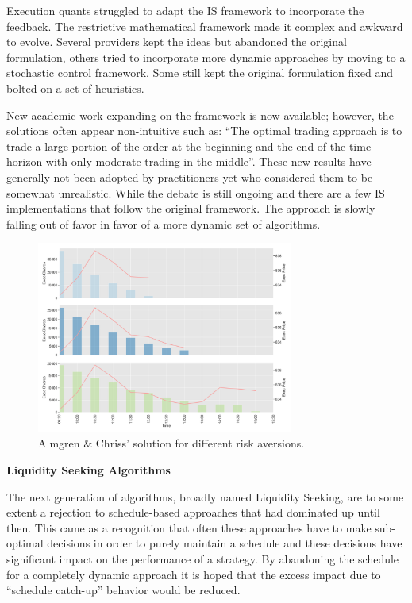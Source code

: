 Execution quants struggled to adapt the IS framework to incorporate the feedback. The restrictive mathematical framework made it complex and awkward to evolve. Several providers kept the ideas but abandoned the original formulation, others tried to incorporate more dynamic approaches by moving to a stochastic control framework. Some still kept the original formulation fixed and bolted on a set of heuristics.


New academic work expanding on the framework is now available; however, the solutions often appear non-intuitive such as: ``The optimal trading approach is to trade a large portion of the order at the beginning and the end of the time horizon with only moderate trading in the middle''. These new results have generally not been adopted by practitioners yet who considered them to be somewhat unrealistic. While the debate is still ongoing and there are a few IS implementations that follow the original framework. The approach is slowly falling out of favor in favor of a more dynamic set of algorithms. \twomedskip

	\begin{figure}[!ht]
	\centering
	\includegraphics[width=0.75\textwidth]{chapters/chapter_exec_models/figures/is.png} 
	\caption{Almgren \& Chriss' solution for different risk aversions. \label{fig:is}}
	\end{figure}



\noindent\textbf{Liquidity Seeking Algorithms} \twomedskip


The next generation of algorithms, broadly named Liquidity Seeking, are to some extent a rejection to schedule-based approaches that had dominated up until then. This came as a recognition that often these approaches have to make sub-optimal decisions in order to purely maintain a schedule and these decisions have significant impact on the performance of a strategy. By abandoning the schedule for a completely dynamic approach it is hoped that the excess impact due to ``schedule catch-up'' behavior would be reduced.

